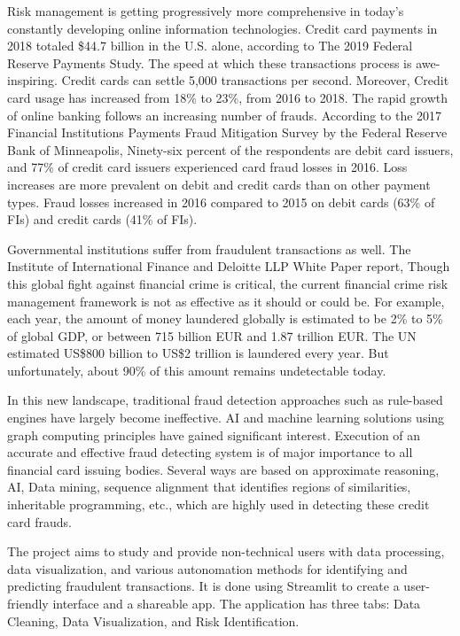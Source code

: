 \documentclass[a4paper,twocolumn,12pt]{article}
\begin{document}
Risk management is getting progressively more comprehensive in today's constantly developing online information technologies. Credit card payments in 2018 totaled \$44.7 billion in the U.S. alone, according to The 2019 Federal Reserve Payments Study. The speed at which these transactions process is awe-inspiring. Credit cards can settle 5,000 transactions per second.\cite{cardrates} Moreover, Credit card usage has increased from 18\% to 23\%, from 2016 to 2018.\cite{cardrates} The rapid growth of online banking follows an increasing number of frauds. According to the 2017 Financial Institutions Payments Fraud Mitigation Survey by the Federal Reserve Bank of Minneapolis, Ninety-six percent of the respondents are debit card issuers, and 77\% of credit card issuers experienced card fraud losses in 2016. Loss increases are more prevalent on debit and credit cards than on other payment types. Fraud losses increased in 2016 compared to 2015 on debit cards (63\% of FIs) and credit cards (41\% of FIs).\cite{dorphy20182017}


Governmental institutions suffer from fraudulent transactions as well. The Institute of International Finance and Deloitte LLP White Paper report, Though this global fight against financial crime is critical, the current financial crime risk management framework is not as effective as it should or could be. For example, each year, the amount of money laundered globally  is estimated to be 2\% to 5\% of global GDP, or between 715 billion EUR and 1.87 trillion EUR.\cite{shepard2019global}  The UN estimated US\$800 billion to US\$2 trillion is laundered every year. But unfortunately, about 90\% of this amount remains undetectable today.\cite{chairunnisa2023tracking}


In this new landscape, traditional fraud detection approaches such as rule-based engines have largely become ineffective. AI and machine learning solutions using graph computing principles have gained significant interest.\cite{kurshan2020financial} Execution of an accurate and effective fraud detecting system is of major importance to all financial card issuing bodies. Several ways are based on approximate reasoning, AI, Data mining, sequence alignment that identifies regions of similarities, inheritable programming, etc., which are highly used in detecting these credit card frauds.\cite{9913607}


The project aims to study and provide non-technical users with data processing, data visualization, and various autonomation methods for identifying and predicting fraudulent transactions. It is done using Streamlit to create a user-friendly interface and a shareable app. The application has three tabs: Data Cleaning, Data Visualization, and Risk Identification.
\end{document}
